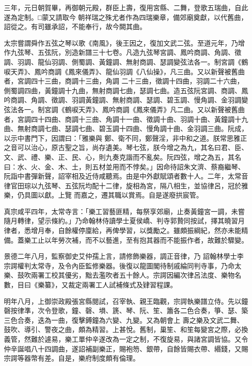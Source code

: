 \begin{pinyinscope}
 三年，元日朝賀畢，再御朝元殿，群臣上壽，復用宮縣、二舞，登歌五瑞曲，自此遂為定制。□蒙又請取今
 朝祥瑞之殊尤者作為四瑞樂章，備郊廟奠獻，以代舊曲，詔從之。有司雖承詔，不能奉行，故今闕其曲。



 太宗嘗謂舜作五弦之琴以歌《南風》，後王因之，復加文武二弦。至道元年，乃增作九弦琴、五弦阮，別造新譜三十七卷。凡造九弦琴宮調、鳳吟商調、角調、徵調、羽調、龍仙羽調、側蜀調、黃鐘調、無射商調、瑟調變弦法各一。制宮調《鶴唳天弄》、鳳吟商調《鳳來儀弄》、龍仙羽調《八仙操》，凡三曲。又以新聲被舊曲者，宮調四十三曲，商調十三曲，角調
 二十三曲，徵調十四曲，羽調二十六曲，側蜀調四曲，黃鐘調十九曲，無射商調七曲，瑟調七曲。造五弦阮宮調、商調、鳳吟商調、角調、徵調、羽調黃鐘調、無射商調、瑟調、碧玉調、慢角調、金羽調變弦法各一。制宮調《鶴唳天弄》、鳳吟商調《鳳來儀弄》凡二曲。又以新聲被舊曲者，宮調四十四曲、商調十三曲、角調十一曲、徵調十曲、羽調十曲、黃鐘調十九曲、無射商調七曲、瑟調七曲、碧玉調十四曲、慢角調十曲、金羽調三曲。阮成，以示中書門下，因謂曰：「雅樂與
 鄭、衛不同，鄭聲淫，非中和之道。朕常思雅正之音可以治心，原古聖之旨，尚存遺美。琴七弦，朕今增之為九，其名曰君、臣、文、武、禮、樂、正、民、心，則九奏克諧而不亂矣。阮四弦，增之為五，其名曰：水、火、金、木、土，則五材並用而不悖矣。」因命待詔朱文濟、蔡裔繼琴、阮詣中書彈新聲，詔宰相及近侍咸聽焉。由是中外獻賦頌者數十人。二年，太常音律官田琮以九弦琴、五弦阮均配十二律，旋相為宮，隔八相生，並協律呂，冠於雅樂，仍具圖以獻。上覽
 而嘉之，遷其職以賞焉。自是遂廢拱宸管。



 真宗咸平四年，太常寺言：「樂工習藝匪精，每祭享郊廟，止奏黃鐘宮一調，未嘗隨月轉律，望示條約。」乃命翰林侍讀學士夏侯嶠、判寺郭贄同按試，擇其曉習月律者，悉增月奉，自餘權停廩給，再俾學習，以獎勵之。雖頗振綱紀，然亦未能精備。蓋樂工止以年勞次補，而不以藝進，至有抱其器而不能振作者，故難於驟變。



 景德二年八月，監察御史艾仲孺上言，請修飾樂器，調正音律，乃
 詔翰林學士李宗諤權判太常寺，及令內臣監修樂器。後復以龍圖閣待制戚綸同判寺事，乃命太樂、鼓吹兩署工校其優劣，黜去濫吹者五十餘人。宗諤因編次律呂法度、樂物名數，目曰《樂纂》，又裁定兩署工人試補條式及肄習程課。



 明年八月，上御崇政殿張宮縣閱試，召宰執、親王臨觀，宗諤執樂譜立侍。先以鐘磬按律準，次令登歌，鐘、磬、塤、篪、琴、阮、笙、簫各二色合奏，箏、瑟、築三色合奏，迭為一曲，復擊鎛鐘為六變、九變。又為朝會上
 壽之樂及文武二舞、鼓吹、導引、警夜之曲，頗為精習。上甚悅。舊制，巢笙、和笙每變宮之際，必換義管，然難於遽易，樂工單仲辛遂改為一定之制，不復旋易，與諸宮調皆協。又令仲辛誕唱八十四調曲，遂詔補副樂正，賜袍笏、銀帶，自餘皆賜衣帶、緡錢，又賜宗諤等器幣有差。自是，樂府制度頗有倫理。




\end{pinyinscope}
